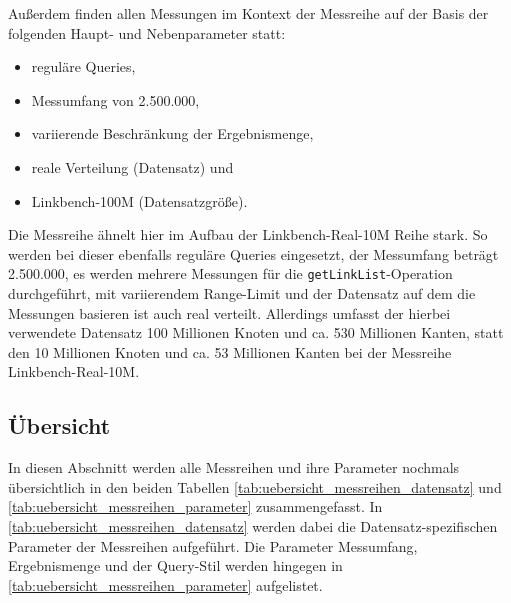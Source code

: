 Außerdem finden allen Messungen im Kontext der Messreihe auf der Basis der folgenden Haupt- und Nebenparameter statt:
\begin{itemize}
    \item reguläre Queries,
    \item Messumfang von 2.500.000,
    \item variierende Beschränkung der Ergebnismenge,
    \item reale Verteilung (Datensatz) und
    \item Linkbench-100M (Datensatzgröße).
\end{itemize}
Die Messreihe ähnelt hier im Aufbau der Linkbench-Real-10M Reihe stark. So werden bei dieser ebenfalls reguläre Queries eingesetzt, der Messumfang beträgt 2.500.000, es werden mehrere Messungen für die \texttt{getLinkList}-Operation durchgeführt, mit variierendem Range-Limit und der Datensatz auf dem die Messungen basieren ist auch real verteilt. Allerdings umfasst der hierbei verwendete Datensatz 100 Millionen Knoten und ca. 530 Millionen Kanten, statt den 10 Millionen Knoten und ca. 53 Millionen Kanten bei der Messreihe Linkbench-Real-10M.

\subsection{Übersicht}
In diesen Abschnitt werden alle Messreihen und ihre Parameter nochmals übersichtlich in den beiden Tabellen \autoref{tab:uebersicht_messreihen_datensatz} und \autoref{tab:uebersicht_messreihen_parameter} zusammengefasst. In \autoref{tab:uebersicht_messreihen_datensatz} werden dabei die Datensatz-spezifischen Parameter der Messreihen aufgeführt. Die Parameter Messumfang, Ergebnismenge und der Query-Stil werden hingegen in \autoref{tab:uebersicht_messreihen_parameter} aufgelistet.

